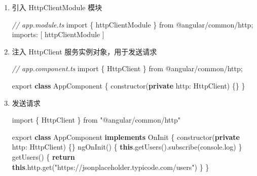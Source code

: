 \documentclass[
]{article}
\newenvironment{Shaded}{}{}
\newcommand{\AttributeTok}[1]{\textcolor[rgb]{0.49,0.56,0.16}{#1}}
\newcommand{\BuiltInTok}[1]{#1}
\newcommand{\CommentTok}[1]{\textcolor[rgb]{0.38,0.63,0.69}{\textit{#1}}}
\newcommand{\ControlFlowTok}[1]{\textcolor[rgb]{0.00,0.44,0.13}{\textbf{#1}}}
\newcommand{\DataTypeTok}[1]{\textcolor[rgb]{0.56,0.13,0.00}{#1}}
\newcommand{\FunctionTok}[1]{\textcolor[rgb]{0.02,0.16,0.49}{#1}}
\newcommand{\ImportTok}[1]{#1}
\newcommand{\KeywordTok}[1]{\textcolor[rgb]{0.00,0.44,0.13}{\textbf{#1}}}
\newcommand{\NormalTok}[1]{#1}
\newcommand{\OperatorTok}[1]{\textcolor[rgb]{0.40,0.40,0.40}{#1}}
\newcommand{\StringTok}[1]{\textcolor[rgb]{0.25,0.44,0.63}{#1}}
\begin{document}
\begin{enumerate}
\def\labelenumi{\arabic{enumi}.}
\item
  引入 HttpClientModule 模块

\begin{Shaded}
\begin{Highlighting}[]
\CommentTok{// app.module.ts}
\ImportTok{import}\NormalTok{ \{ httpClientModule \} }\ImportTok{from} \StringTok{\textquotesingle{}@angular/common/http\textquotesingle{}}\OperatorTok{;}
\NormalTok{imports}\OperatorTok{:}\NormalTok{ [}
\NormalTok{  httpClientModule}
\NormalTok{]}
\end{Highlighting}
\end{Shaded}
\item
  注入 HttpClient 服务实例对象，用于发送请求

\begin{Shaded}
\begin{Highlighting}[]
\CommentTok{// app.component.ts}
\ImportTok{import}\NormalTok{ \{ HttpClient \} }\ImportTok{from} \StringTok{\textquotesingle{}@angular/common/http\textquotesingle{}}\OperatorTok{;}

\ImportTok{export} \KeywordTok{class}\NormalTok{ AppComponent \{}
	\FunctionTok{constructor}\NormalTok{(}\KeywordTok{private} \DataTypeTok{http}\OperatorTok{:}\NormalTok{ HttpClient) \{\}}
\NormalTok{\}}
\end{Highlighting}
\end{Shaded}
\item
  发送请求

\begin{Shaded}
\begin{Highlighting}[]
\ImportTok{import}\NormalTok{ \{ HttpClient \} }\ImportTok{from} \StringTok{"@angular/common/http"}

\ImportTok{export} \KeywordTok{class}\NormalTok{ AppComponent }\KeywordTok{implements}\NormalTok{ OnInit \{}
  \FunctionTok{constructor}\NormalTok{(}\KeywordTok{private} \DataTypeTok{http}\OperatorTok{:}\NormalTok{ HttpClient) \{\}}
  \FunctionTok{ngOnInit}\NormalTok{() \{}
    \KeywordTok{this}\OperatorTok{.}\FunctionTok{getUsers}\NormalTok{()}\OperatorTok{.}\FunctionTok{subscribe}\NormalTok{(}\BuiltInTok{console}\OperatorTok{.}\FunctionTok{log}\NormalTok{)}
\NormalTok{  \}}
  \FunctionTok{getUsers}\NormalTok{() \{}
    \ControlFlowTok{return} \KeywordTok{this}\OperatorTok{.}\AttributeTok{http}\OperatorTok{.}\FunctionTok{get}\NormalTok{(}\StringTok{"https://jsonplaceholder.typicode.com/users"}\NormalTok{)}
\NormalTok{  \}}
\NormalTok{\}}
\end{Highlighting}
\end{Shaded}
\end{enumerate}
\end{document}
